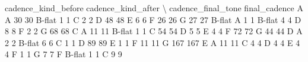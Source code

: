 \documentclass[letterpaper,10pt,english]{sphinxmanual}
\begin{document}
{\begin{sphinxVerbatim}[commandchars=\\\{\}]
                                  cadence\_kind\_before  cadence\_kind\_after  \textbackslash{}
cadence\_final\_tone final\_cadence
A                  A                               30                  30
                   B-flat                           1                   1
                   C                                2                   2
                   D                               48                  48
                   E                                6                   6
                   F                               26                  26
                   G                               27                  27
B-flat             A                                1                   1
                   B-flat                           4                   4
                   D                                8                   8
                   F                                2                   2
                   G                               68                  68
C                  A                               11                  11
                   B-flat                           1                   1
                   C                               54                  54
                   D                                5                   5
                   E                                4                   4
                   F                               72                  72
                   G                               44                  44
D                  A                                2                   2
                   B-flat                           6                   6
                   C                                1                   1
                   D                               89                  89
                   E                                1                   1
                   F                               11                  11
                   G                              167                 167
E                  A                               11                  11
                   C                                4                   4
                   D                                4                   4
                   E                                4                   4
                   F                                1                   1
                   G                                7                   7
F                  B-flat                           1                   1
                   C                                9                   9

\end{sphinxVerbatim}}
\end{document}
